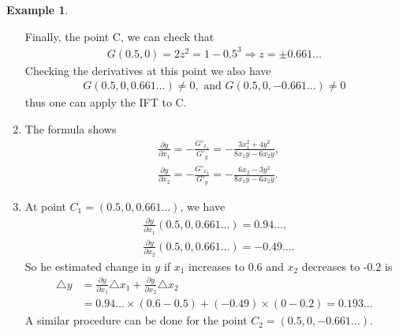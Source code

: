 \documentclass[10pt,a4paper]{book}
\theoremstyle{definition}\newtheorem{definition}{Definition}
\theoremstyle{definition}\newtheorem{fact}{Fact}
\theoremstyle{definition}\newtheorem{ex}{Ex.}
\theoremstyle{definition}\newtheorem{project}{Project}
\theoremstyle{definition}\newtheorem{problem}{Problem}
\theoremstyle{definition}\newtheorem{example}{Example}
\numberwithin{theorem}{chapter}
\numberwithin{corollary}{chapter}
\numberwithin{assumption}{chapter}
\numberwithin{definition}{chapter}
\numberwithin{prop}{chapter}
\numberwithin{notation}{chapter}
\numberwithin{problem}{chapter}
\numberwithin{example}{chapter}
\numberwithin{fact}{chapter}
\numberwithin{ex}{chapter}
\begin{document}
\begin{example}
\begin{enumerate}
			Finally, the point C, we can check that
			\begin{align*}
				G(0.5, 0 ) = 2 z^2 = 1 - 0.5^3  \Rightarrow z = \pm 0.661\dots
			\end{align*}
			Checking the derivatives at this point we also have
			\begin{align*}
				G(0.5, 0, 0.661\dots) \neq 0, \text{ and } G(0.5, 0, -0.661\dots) \neq 0
			\end{align*}
			thus one can apply the IFT to C.
			\item The formula shows
			\begin{align*}
				&\frac{\partial y}{\partial x_1} = - \frac{G'_{x_1}}{G'_{y}} = - \frac{3x^2_1 + 4y^2}{8x_1 y - 6 x_2 y}, \\
				&\frac{\partial y}{\partial x_2} = - \frac{G'_{x_2}}{G'_{y}} = - \frac{6x_2 - 3y^2}{8x_1 y - 6 x_2 y}.
			\end{align*}
			\item At point $C_1 = (0.5,0,0.661\dots)$, we have
			\begin{align*}
				&\frac{\partial y}{\partial x_1} (0.5, 0, 0.661\dots) = 0.94\dots, \\
				&\frac{\partial y}{\partial x_2} (0.5, 0, 0.661\dots) = -0.49\dots.
			\end{align*}
			So he estimated change in $y$ if $x_1$ increases to 0.6 and $x_2$ decreases to -0.2 is
			\begin{align*}
				\triangle y &= \frac{\partial y}{\partial x_1} \triangle x_1 + \frac{\partial y}{\partial x_2} \triangle x_2 \\
				&= 0.94\dots \times (0.6 - 0.5) + (-0.49)\times (0-0.2) = 0.193\dots
			\end{align*}
			A similar procedure can be done for the point $C_2 = (0.5,0,-0.661\dots)$.
		\end{enumerate}
	\end{example}
	
\end{document}
